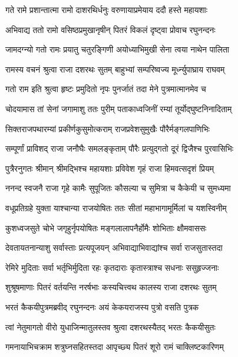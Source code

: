 
\twolineshloka
{गते रामे प्रशान्तात्मा रामो दाशरथिर्धनुः}
{वरुणायाप्रमेयाय ददौ हस्ते महायशाः} %

\twolineshloka
{अभिवाद्य ततो रामो वसिष्ठप्रमुखानृषीन्}
{पितरं विकलं दृष्ट्वा प्रोवाच रघुनन्दनः} %

\twolineshloka
{जामदग्न्यो गतो रामः प्रयातु चतुरङ्गिणी}
{अयोध्याभिमुखी सेना त्वया नाथेन पालिता} %

\twolineshloka
{रामस्य वचनं श्रुत्वा राजा दशरथः सुतम्}
{बाहुभ्यां सम्परिष्वज्य मूर्ध्न्युपाघ्राय राघवम्} %

\twolineshloka
{गतो राम इति श्रुत्वा हृष्टः प्रमुदितो नृपः}
{पुनर्जातं तदा मेने पुत्रमात्मानमेव च} %

\twolineshloka
{चोदयामास तां सेनां जगामाशु ततः पुरीम्}
{पताकाध्वजिनीं रम्यां तूर्योद्घुष्टनिनादिताम्} %

\twolineshloka
{सिक्तराजपथारम्यां प्रकीर्णकुसुमोत्कराम्}
{राजप्रवेशसुमुखैः पौरैर्मङ्गलपाणिभिः} %

\twolineshloka
{सम्पूर्णां प्राविशद् राजा जनौघैः समलङ्कृताम्}
{पौरैः प्रत्युद्गतो दूरं द्विजैश्च पुरवासिभिः} %

\twolineshloka
{पुत्रैरनुगतः श्रीमान् श्रीमद्भिश्च महायशाः}
{प्रविवेश गृहं राजा हिमवत्सदृशं प्रियम्} %

\twolineshloka
{ननन्द स्वजनै राजा गृहे कामैः सुपूजितः}
{कौसल्या च सुमित्रा च कैकेयी च सुमध्यमा} %

\twolineshloka
{वधूप्रतिग्रहे युक्ता याश्चान्या राजयोषितः}
{ततः सीतां महाभागामूर्मिलां च यशस्विनीम्} %

\twolineshloka
{कुशध्वजसुते चोभे जगृहुर्नृपयोषितः}
{मङ्गलालापनैर्होमैः शोभिताः क्षौमवाससः} %

\twolineshloka
{देवतायतनान्याशु सर्वास्ताः प्रत्यपूजयन्}
{अभिवाद्याभिवाद्यांश्च सर्वा राजसुतास्तदा} %

\twolineshloka
{रेमिरे मुदिताः सर्वा भर्तृभिर्मुदिता रहः}
{कृतदाराः कृतास्त्राश्च सधनाः ससुहृज्जनाः} %

\twolineshloka
{शुश्रूषमाणाः पितरं वर्तयन्ति नरर्षभाः}
{कस्यचित्त्वथ कालस्य राजा दशरथः सुतम्} %

\twolineshloka
{भरतं कैकयीपुत्रमब्रवीद् रघुनन्दनः}
{अयं केकयराजस्य पुत्रो वसति पुत्रक} %

\twolineshloka
{त्वां नेतुमागतो वीरो युधाजिन्मातुलस्तव}
{श्रुत्वा दशरथस्यैतद् भरतः कैकयीसुतः} %

\twolineshloka
{गमनायाभिचक्राम शत्रुघ्नसहितस्तदा}
{आपृच्छ्य पितरं शूरो रामं चाक्लिष्टकारिणम्} %

